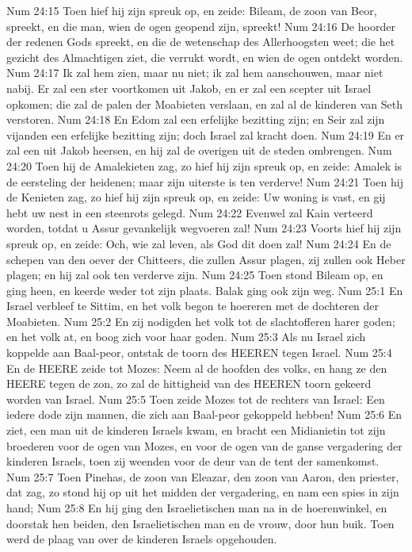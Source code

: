 Num 24:15  Toen hief hij zijn spreuk op, en zeide: Bileam, de zoon van Beor, spreekt, en die man, wien de ogen geopend zijn, spreekt!
Num 24:16  De hoorder der redenen Gods spreekt, en die de wetenschap des Allerhoogsten weet; die het gezicht des Almachtigen ziet, die verrukt wordt, en wien de ogen ontdekt worden.
Num 24:17  Ik zal hem zien, maar nu niet; ik zal hem aanschouwen, maar niet nabij. Er zal een ster voortkomen uit Jakob, en er zal een scepter uit Israel opkomen; die zal de palen der Moabieten verslaan, en zal al de kinderen van Seth verstoren.
Num 24:18  En Edom zal een erfelijke bezitting zijn; en Seir zal zijn vijanden een erfelijke bezitting zijn; doch Israel zal kracht doen.
Num 24:19  En er zal een uit Jakob heersen, en hij zal de overigen uit de steden ombrengen.
Num 24:20  Toen hij de Amalekieten zag, zo hief hij zijn spreuk op, en zeide: Amalek is de eersteling der heidenen; maar zijn uiterste is ten verderve!
Num 24:21  Toen hij de Kenieten zag, zo hief hij zijn spreuk op, en zeide: Uw woning is vast, en gij hebt uw nest in een steenrots gelegd.
Num 24:22  Evenwel zal Kain verteerd worden, totdat u Assur gevankelijk wegvoeren zal!
Num 24:23  Voorts hief hij zijn spreuk op, en zeide: Och, wie zal leven, als God dit doen zal!
Num 24:24  En de schepen van den oever der Chitteers, die zullen Assur plagen, zij zullen ook Heber plagen; en hij zal ook ten verderve zijn.
Num 24:25  Toen stond Bileam op, en ging heen, en keerde weder tot zijn plaats. Balak ging ook zijn weg.
Num 25:1  En Israel verbleef te Sittim, en het volk begon te hoereren met de dochteren der Moabieten.
Num 25:2  En zij nodigden het volk tot de slachtofferen harer goden; en het volk at, en boog zich voor haar goden.
Num 25:3  Als nu Israel zich koppelde aan Baal-peor, ontstak de toorn des HEEREN tegen Israel.
Num 25:4  En de HEERE zeide tot Mozes: Neem al de hoofden des volks, en hang ze den HEERE tegen de zon, zo zal de hittigheid van des HEEREN toorn gekeerd worden van Israel.
Num 25:5  Toen zeide Mozes tot de rechters van Israel: Een iedere dode zijn mannen, die zich aan Baal-peor gekoppeld hebben!
Num 25:6  En ziet, een man uit de kinderen Israels kwam, en bracht een Midianietin tot zijn broederen voor de ogen van Mozes, en voor de ogen van de ganse vergadering der kinderen Israels, toen zij weenden voor de deur van de tent der samenkomst.
Num 25:7  Toen Pinehas, de zoon van Eleazar, den zoon van Aaron, den priester, dat zag, zo stond hij op uit het midden der vergadering, en nam een spies in zijn hand;
Num 25:8  En hij ging den Israelietischen man na in de hoerenwinkel, en doorstak hen beiden, den Israelietischen man en de vrouw, door hun buik. Toen werd de plaag van over de kinderen Israels opgehouden.
